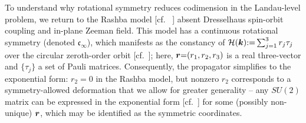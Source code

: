 \documentclass[aps, prb, showpacs, twocolumn, notitlepage, superscriptaddress]{revtex4-1}
\begin{document}


To understand why rotational symmetry reduces codimension in the Landau-level problem, we return to the Rashba model [cf. \ ] absent Dresselhaus spin-orbit coupling and in-plane Zeeman field. This model has a continuous rotational symmetry (denoted $\mathfrak{c}_{\infty}$), which manifests as the constancy of ${\cal H}(\boldsymbol{k}){:}{=}\sum_{j=1}^3r_j\tau_j$ over the circular zeroth-order orbit [cf.\ ]; here, $\boldsymbol{r}{=}(r_1,r_2,r_3)$ is a real three-vector and $\{\tau_j\}$ a set of Pauli matrices.  Consequently, the propagator  simplifies to  the exponential form:
$r_2{=}0$ in the Rashba model, but nonzero $r_2$ corresponds to a symmetry-allowed deformation that we allow for greater generality -- any $SU(2)$ matrix can be expressed in the exponential form [cf.\ ]  for some (possibly non-unique) $\boldsymbol{r}$, which may be identified as the symmetric  coordinates.  
\end{document}
